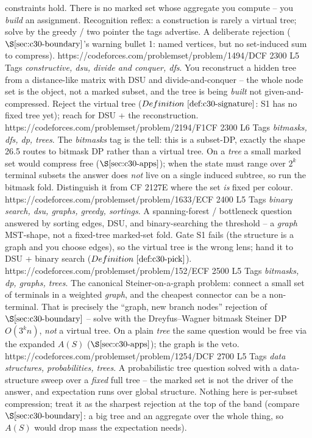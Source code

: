 \begin{mixedset}
{     constraints hold. There is no marked set whose aggregate you compute -- you \emph{build} an
     assignment. Recognition reflex: a construction is rarely a virtual tree; solve by the greedy / two
     pointer the tags advertise. A deliberate rejection (\(\secref{c30-boundary}\)'s warning bullet 1:
     named vertices, but no set-induced sum to compress).}
    {https://codeforces.com/problemset/problem/1494/D}{CF 2300 L5}
    {Tags \emph{constructive, dsu, divide and conquer, dfs}. You reconstruct a hidden tree from a
     distance-like matrix with DSU and divide-and-conquer -- the whole node set is the object, not a
     marked subset, and the tree is being \emph{built} not given-and-compressed. Reject the virtual tree
     (\(\defref{c30-signature}\): S1 has no fixed tree yet); reach for DSU + the reconstruction.}
    {https://codeforces.com/problemset/problem/2194/F1}{CF 2300 L6}
    {Tags \emph{bitmasks, dfs, dp, trees}. The \emph{bitmasks} tag is the tell: this is a
     subset-DP, exactly the shape 26.5 routes to bitmask DP rather than a virtual tree. On a \emph{tree}
     a small marked set would compress free (\(\secref{c30-apps}\)); when the state must range over
     \(2^k\) terminal subsets the answer does \emph{not} live on a single induced subtree, so run the
     bitmask fold. Distinguish it from CF 2127E where the set \emph{is} fixed per colour.}
    {https://codeforces.com/problemset/problem/1633/E}{CF 2400 L5}
    {Tags \emph{binary search, dsu, graphs, greedy, sortings}. A spanning-forest / bottleneck question
     answered by sorting edges, DSU, and binary-searching the threshold -- a \emph{graph} MST-shape, not
     a fixed-tree marked-set fold. Gate S1 fails (the structure is a graph and you choose edges), so the
     virtual tree is the wrong lens; hand it to DSU + binary search (\(\defref{c30-pick}\)).}
    {https://codeforces.com/problemset/problem/152/E}{CF 2500 L5}
    {Tags \emph{bitmasks, dp, graphs, trees}. The canonical Steiner-on-a-graph problem: connect a small
     set of terminals in a weighted \emph{graph}, and the cheapest connector can be a non-terminal. That
     is precisely the ``graph, new branch nodes'' rejection of \(\secref{c30-boundary}\) -- solve with the
     Dreyfus--Wagner bitmask Steiner DP \(O(3^k n)\), \emph{not} a virtual tree. On a plain \emph{tree} the
     same question would be free via the expanded \(A(S)\) (\(\secref{c30-apps}\)); the graph is the veto.}
    {https://codeforces.com/problemset/problem/1254/D}{CF 2700 L5}
    {Tags \emph{data structures, probabilities, trees}. A probabilistic tree question solved with a
     data-structure sweep over a \emph{fixed} full tree -- the marked set is not the driver of the answer,
     and expectation runs over global structure. Nothing here is per-subset compression; treat it as the
     sharpest rejection at the top of the band (compare \(\secref{c30-boundary}\): a big tree and an
     aggregate over the whole thing, so \(A(S)\) would drop mass the expectation needs).}
\end{mixedset}



